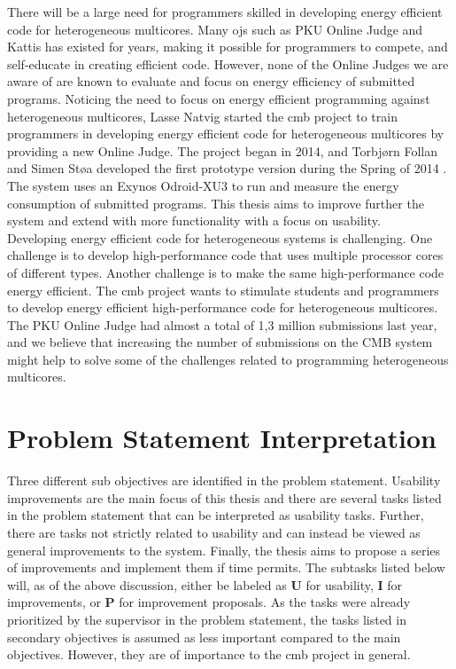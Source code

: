 There will be a large need for programmers skilled in developing energy efficient code for heterogeneous multicores. Many \glspl{oj} such as PKU Online Judge \cite{PKU} and Kattis \cite{KATTIS} has existed for years, making it possible for programmers to compete, and self-educate in creating efficient code. However, none of the Online Judges we are aware of are known to evaluate and focus on energy efficiency of submitted programs. Noticing the need to focus on energy efficient programming against heterogeneous multicores, Lasse Natvig started the \gls{cmb} project to train programmers in developing energy efficient code for heterogeneous multicores by providing a new Online Judge. The project began in 2014, and Torbjørn Follan and Simen Støa developed the first prototype version during the Spring of 2014 \cite{mt:T&S}. The system uses an Exynos Odroid-XU3 \cite{XU3} to run and measure the energy consumption of submitted programs. This thesis aims to improve further the system and extend with more functionality with a focus on usability. \\

Developing energy efficient code for heterogeneous systems is challenging. One challenge is to develop high-performance code that uses multiple processor cores of different types. Another challenge is to make the same high-performance code energy efficient. The \gls{cmb} project wants to stimulate students and programmers to develop energy efficient high-performance code for heterogeneous multicores. The PKU Online Judge \cite{PKU} had almost a total of 1,3 million submissions last year, and we believe that increasing the number of submissions on the CMB system might help to solve some of the challenges related to programming heterogeneous multicores. \\

\clearpage

\section{Problem Statement Interpretation}
\label{sec:rq}
Three different sub objectives are identified in the problem statement. Usability improvements are the main focus of this thesis and there are several tasks listed in the problem statement that can be interpreted as usability tasks. Further, there are tasks not strictly related to usability and can instead be viewed as general improvements to the system. Finally, the thesis aims to propose a series of improvements and implement them if time permits. The subtasks listed below will, as of the above discussion, either be labeled as \textbf{U} for usability, \textbf{I} for improvements, or \textbf{P} for improvement proposals. As the tasks were already prioritized by the supervisor in the problem statement, the tasks listed in secondary objectives is assumed as less important compared to the main objectives. However, they are of importance to the \gls{cmb} project in general.

